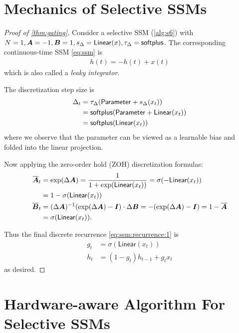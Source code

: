 \section{Mechanics of Selective SSMs}
\label{sec:mechanics}

%

\begin{proof}[Proof of \cref{thm:gating}]
Consider a selective SSM (\cref{alg:s6}) with
$N=1, \bm{A}=-1, \bm{B}=1, s_\Delta=\mathsf{Linear}(x), \tau_\Delta=\mathsf{softplus}$.
The corresponding continuous-time SSM \eqref{eq:ssm} is
\begin{align*}%
  h(t) = -h(t) + x(t)
\end{align*}
which is also called a \emph{leaky integrator}.

The discretization step size is
\begin{align*}%
  \dt_t &= \tau_\dt(\mathsf{Parameter} + s_\dt(x_t)) \\
      &= \mathsf{softplus}(\mathsf{Parameter} + \mathsf{Linear}(x_t)) \\
      &= \mathsf{softplus}(\mathsf{Linear}(x_t))
\end{align*}
where we observe that the parameter can be viewed as a learnable bias and folded into the linear projection.

Now applying the zero-order hold (ZOH) discretization formulas:
\begin{align*}%
  \dA_t &= \exp(\dt \A) = \frac{1}{1 + \exp(\mathsf{Linear}(x_t))} = \sigma(-\mathsf{Linear}(x_t))
    \\&= 1 - \sigma(\mathsf{Linear}(x_t))
    \\
  \dB_t &= (\dt \bm{A})^{-1} (\exp(\dt \bm{A}) - \bm{I}) \cdot \dt \bm{B} = -(\exp(\dt \bm{A}) - \bm{I}) = 1 - \dA
    \\&= \sigma(\mathsf{Linear}(x_t))
    .
\end{align*}

Thus the final discrete recurrence \eqref{eq:ssm:recurrence:1} is
\begin{align*}%
  g_t &= \sigma(\mathsf{Linear}(x_t)) \\
  h_{t} &= (1-g_t) h_{t-1} + g_t x_t
\end{align*}
as desired.
\end{proof}

%

\section{Hardware-aware Algorithm For Selective SSMs}
\label{sec:hardware_aware_algo}

